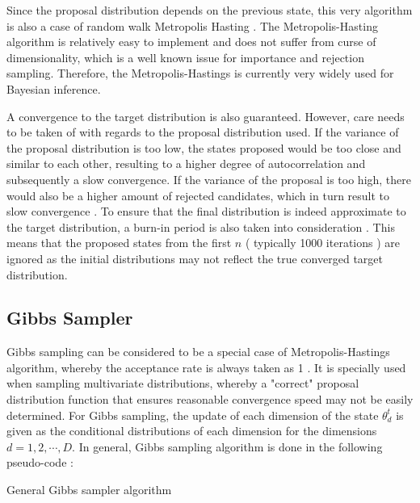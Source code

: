 \documentclass{usiinftr}
\begin{document}
Since the proposal distribution depends on the previous state, this very algorithm is also a case of random walk Metropolis Hasting \cite{21}. The Metropolis-Hasting algorithm is relatively easy to implement and does not suffer from curse of dimensionality, which is a well known issue for importance and rejection sampling. Therefore, the Metropolis-Hastings is currently very widely used for Bayesian inference. 

A convergence to the target distribution is also guaranteed. However, care needs to be taken of with regards to the proposal distribution used. If the variance of the proposal distribution is too low, the states proposed would be too close and similar to each other, resulting to a higher degree of autocorrelation and subsequently a slow convergence. If the variance of the proposal is too high, there would also be a higher amount of rejected candidates, which in turn result to slow convergence \cite{30}. To ensure that the final distribution is indeed approximate to the target distribution, a burn-in period is also taken into consideration \cite{29}. This means that the proposed states from the first $n$ ( typically 1000 iterations ) are ignored as the initial distributions may not reflect the true converged target distribution.


\subsection{Gibbs Sampler} 
Gibbs sampling can be considered to be a special case of Metropolis-Hastings algorithm, whereby the acceptance rate is always taken as 1 \cite{21}. It is specially used when sampling multivariate distributions, whereby a "correct" proposal distribution function that ensures reasonable convergence speed may not be easily determined. For Gibbs sampling, the update of each dimension of the state $\theta^{t}_d$ is given as the conditional distributions of each dimension for the dimensions $d = 1,2,\cdots,D$. In general, Gibbs sampling algorithm is done in the following pseudo-code \cite{21}:

\begin{algorithm}[h]
  \caption{General Gibbs sampler algorithm} \label{algGibbs}
  \begin{algorithmic}[1]
    \Statex
    	\State { $ \vdots $ }
    \EndFor
    \State \Return{$\theta$}
    \EndFunction
  \end{algorithmic}
\end{algorithm}
\end{document}
